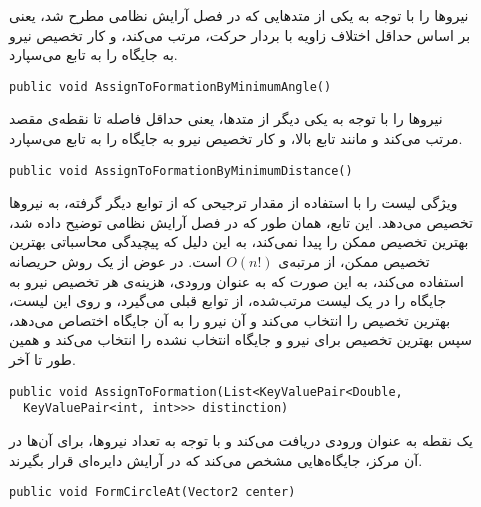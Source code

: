 \begin{description}
  \item[]
  نیروها را با توجه به یکی از متدهایی که در فصل آرایش نظامی مطرح شد، یعنی بر اساس حداقل اختلاف زاویه
  با بردار حرکت، مرتب می‌کند، و کار تخصیص نیرو به جایگاه را به تابع  می‌سپارد.
\begin{latin}
{\linespread{1.2}
{\inconsolata
\lstset{language=Java}
\begin{lstlisting}
public void AssignToFormationByMinimumAngle()
\end{lstlisting}
}
}
\end{latin}
   
  \item[] 
  نیروها را با توجه به یکی دیگر از متدها، یعنی حداقل فاصله تا نقطه‌ی مقصد مرتب می‌کند و مانند تابع بالا،
  و کار تخصیص نیرو به جایگاه را به تابع  می‌سپارد.
\begin{latin}
{\linespread{1.2}
{\inconsolata
\lstset{language=Java}
\begin{lstlisting}
public void AssignToFormationByMinimumDistance()
\end{lstlisting}
}
}
\end{latin}
  
  \item[] 
  ويژگی لیست  را با استفاده از مقدار ترجیحی که از توابع دیگر گرفته، به نیروها تخصیص می‌دهد.
  این تابع، همان طور که در فصل آرایش نظامی توضیح داده شد، بهترین تخصیص ممکن را پیدا نمی‌کند، به این دلیل
  که پیچیدگی محاسباتی بهترین تخصیص ممکن، از مرتبه‌ی $O(n!)$ است. در عوض از یک روش حریصانه استفاده می‌کند،
  به این صورت که به عنوان ورودی، هزینه‌ی هر تخصیص نیرو به جایگاه را در یک لیست مرتب‌شده،
  از توابع قبلی می‌گیرد، و روی این لیست، بهترین تخصیص را انتخاب می‌کند و آن نیرو را به آن جایگاه اختصاص
  می‌دهد، سپس بهترین تخصیص برای نیرو و جایگاه انتخاب نشده را انتخاب می‌کند و همین طور تا آخر.
\begin{latin}
{\linespread{1.2}
{\inconsolata
\lstset{language=Java}
\begin{lstlisting}
public void AssignToFormation(List<KeyValuePair<Double,
  KeyValuePair<int, int>>> distinction)
\end{lstlisting}
}
}
\end{latin}

  \item[]
  یک نقطه به عنوان ورودی دریافت می‌کند و با توجه به تعداد نیروها، برای آن‌ها در آن مرکز،
  جایگاه‌هایی مشخص می‌کند که در آرایش دایره‌ای قرار بگیرند.
\begin{latin}
{\linespread{1.2}
{\inconsolata
\lstset{language=Java}
\begin{lstlisting}
public void FormCircleAt(Vector2 center)
\end{lstlisting}
}
}
\end{latin}


\end{description}
